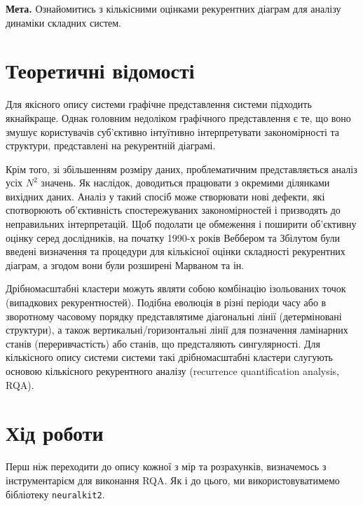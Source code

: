 \documentclass[
  letterpaper,
]{report}
\begin{document}
\textbf{Мета.} Ознайомитись з кількісними оцінками рекурентних діаграм
для аналізу динаміки складних систем.

\hypertarget{ux442ux435ux43eux440ux435ux442ux438ux447ux43dux456-ux432ux456ux434ux43eux43cux43eux441ux442ux456-2}{%
\section{Теоретичні
відомості}\label{ux442ux435ux43eux440ux435ux442ux438ux447ux43dux456-ux432ux456ux434ux43eux43cux43eux441ux442ux456-2}}

Для якісного опису системи графічне представлення системи підходить
якнайкраще. Однак головним недоліком графічного представлення є те, що
воно змушує користувачів суб'єктивно інтуїтивно інтерпретувати
закономірності та структури, представлені на рекурентній діаграмі.

Крім того, зі збільшенням розміру даних, проблематичним представляється
аналіз усіх \(N^2\) значень. Як наслідок, доводиться працювати з
окремими ділянками вихідних даних. Аналіз у такий спосіб може створювати
нові дефекти, які спотворюють об'єктивність спостережуваних
закономірностей і призводять до неправильних інтерпретацій. Щоб подолати
це обмеження і поширити об'єктивну оцінку серед дослідників, на початку
1990-х років Веббером та Збілутом були введені визначення та процедури
для кількісної оцінки складності рекурентних діаграм, а згодом вони були
розширені Марваном та ін.

Дрібномасштабні кластери можуть являти собою комбінацію ізольованих
точок (випадкових рекурентностей). Подібна еволюція в різні періоди часу
або в зворотному часовому порядку представлятиме діагональні лінії
(детерміновані структури), а також вертикальні/горизонтальні лінії для
позначення ламінарних станів (переривчастість) або станів, що
предсталяють сингулярності. Для кількісного опису системи системи такі
дрібномасштабні кластери слугують основою кількісного рекурентного
аналізу (recurrence quantification analysis, RQA).

\hypertarget{ux445ux456ux434-ux440ux43eux431ux43eux442ux438-2}{%
\section{Хід
роботи}\label{ux445ux456ux434-ux440ux43eux431ux43eux442ux438-2}}

Перш ніж переходити до опису кожної з мір та розрахунків, визначемось з
інструментарієм для виконання RQA. Як і до цього, ми використовуватимемо
бібліотеку \texttt{neuralkit2}.
\end{document}
